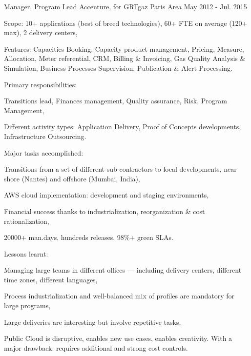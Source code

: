 \begin{cventries}
  \cventry
    {Manager, Program Lead} %
    {Accenture, for GRTgaz} %
    {Paris Area} %
    {May 2012 - Jul. 2015} %
    {
      \begin{cvitems} %
        \item {Scope: 10+ applications (best of breed technologies), 60+ FTE on average (120+ max), 2 delivery centers,}
        \item {Features: Capacities Booking, Capacity product management, Pricing, Measure, Allocation, Meter referential, CRM, Billing \& Invoicing, Gas Quality Analysis \& Simulation, Business Processes Supervision, Publication \& Alert Processing.}
        \item {Primary responsibilities:}
        \begin{cvsubitems}
          \item {Transitions lead, Finances management, Quality assurance, Risk, Program Management,}
          \item {Different activity types: Application Delivery, Proof of Concepts developments, Infrastructure Outsourcing.}
        \end{cvsubitems}
        \item {Major tasks accomplished:}
        \begin{cvsubitems}
          \item {Transitions from a set of different sub-contractors to local developments, near shore (Nantes) and offshore (Mumbai, India),}
          \item {AWS cloud implementation: development and staging environments,}
          \item {Financial success thanks to industrialization, reorganization \& cost rationalization,}
          \item {20000+ man.days, hundreds releases, 98\%+ green SLAs.}
        \end{cvsubitems}
        \item {Lessons learnt:}
        \begin{cvsubitems}
          \item {Managing large teams in different offices --- including delivery centers, different time zones, different languages,}
          \item {Process industrialization and well-balanced mix of profiles are mandatory for large programs,}
          \item {Large deliveries are interesting but involve repetitive tasks,}
          \item {Public Cloud is disruptive, enables new use cases, enables creativity. With a major drawback: requires additional and strong cost controls.}
        \end{cvsubitems}
      \end{cvitems}
    }


\end{cventries}
